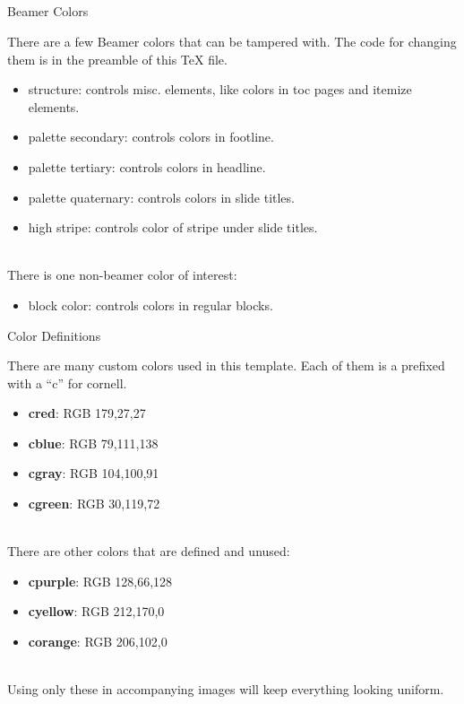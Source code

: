 \documentclass[serif]{beamer}
\begin{document}
\subsection{}

\begin{frame}{Beamer Colors}

There are a few Beamer colors that can be tampered with. The code for changing them is in the preamble of this TeX file.
\begin{itemize}
\item structure: controls misc. elements, like colors in toc pages and itemize elements.
\item palette secondary: controls colors in footline.
\item palette tertiary: controls colors in headline.
\item palette quaternary: controls colors in slide titles.
\item high stripe: controls color of stripe under slide titles.
\end{itemize}
~\\
There is one non-beamer color of interest:
\begin{itemize}
\item block color: controls colors in regular blocks.
\end{itemize}

\end{frame}

\begin{frame}{Color Definitions}

There are many custom colors used in this template. Each of them is a prefixed with a ``c'' for cornell.
\begin{itemize}
\item \textbf{\textcolor{cred}{cred}}: RGB 179,27,27
\item \textbf{\textcolor{cblue}{cblue}}: RGB 79,111,138
\item \textbf{\textcolor{cgray}{cgray}}: RGB 104,100,91
\item \textbf{\textcolor{cgreen}{cgreen}}: RGB 30,119,72
\end{itemize}
~\\
There are other colors that are defined and unused:
\begin{itemize}
\item \textbf{\textcolor{cpurple}{cpurple}}: RGB 128,66,128
\item \textbf{\textcolor{cyellow}{cyellow}}: RGB 212,170,0
\item \textbf{\textcolor{corange}{corange}}: RGB 206,102,0
\end{itemize}
~\\
Using only these in accompanying images will keep everything looking uniform.


\end{frame}
\end{document}
